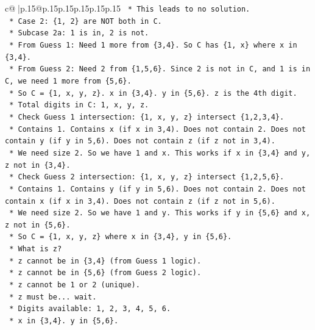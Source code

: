 \documentclass{article}
\begin{document}
{\begin{supertabular}{c@{$\;$}|p{.15\linewidth}@{}p{.15\linewidth}p{.15\linewidth}p{.15\linewidth}p{.15\linewidth}p{.15\linewidth}}
{{{\texttt{        *   This leads to no solution.} \\
\texttt{    *   Case 2: \{1, 2\} are NOT both in C.} \\
\texttt{        *   Subcase 2a: 1 is in, 2 is not.} \\
\texttt{            *   From Guess 1: Need 1 more from \{3,4\}. So C has \{1, x\} where x in \{3,4\}.} \\
\texttt{            *   From Guess 2: Need 2 from \{1,5,6\}. Since 2 is not in C, and 1 is in C, we need 1 more from \{5,6\}.} \\
\texttt{            *   So C = \{1, x, y, z\}. x in \{3,4\}. y in \{5,6\}. z is the 4th digit.} \\
\texttt{            *   Total digits in C: 1, x, y, z.} \\
\texttt{            *   Check Guess 1 intersection: \{1, x, y, z\} intersect \{1,2,3,4\}.} \\
\texttt{                *   Contains 1. Contains x (if x in 3,4). Does not contain 2. Does not contain y (if y in 5,6). Does not contain z (if z not in 3,4).} \\
\texttt{                *   We need size 2. So we have 1 and x. This works if x in \{3,4\} and y, z not in \{3,4\}.} \\
\texttt{            *   Check Guess 2 intersection: \{1, x, y, z\} intersect \{1,2,5,6\}.} \\
\texttt{                *   Contains 1. Contains y (if y in 5,6). Does not contain 2. Does not contain x (if x in 3,4). Does not contain z (if z not in 5,6).} \\
\texttt{                *   We need size 2. So we have 1 and y. This works if y in \{5,6\} and x, z not in \{5,6\}.} \\
\texttt{            *   So C = \{1, x, y, z\} where x in \{3,4\}, y in \{5,6\}.} \\
\texttt{            *   What is z?} \\
\texttt{                *   z cannot be in \{3,4\} (from Guess 1 logic).} \\
\texttt{                *   z cannot be in \{5,6\} (from Guess 2 logic).} \\
\texttt{                *   z cannot be 1 or 2 (unique).} \\
\texttt{                *   z must be... wait.} \\
\texttt{                *   Digits available: 1, 2, 3, 4, 5, 6.} \\
\texttt{                *   x in \{3,4\}. y in \{5,6\}.} \\
}}}
\end{supertabular}}
\end{document}
